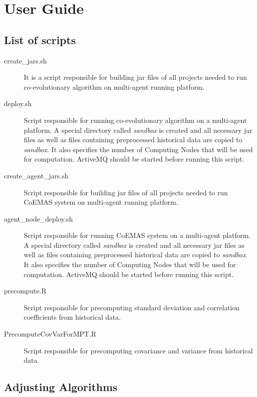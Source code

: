 \chapter{User Guide}
\label{cha:user_guide}



\section{List of scripts}

\begin{description}
  \item [create\_jars.sh]
      It is a script responsible for building jar files of all projects needed to run co-evolutionary algorithm on multi-agent running platform. 
  \item [deploy.sh]
      Script responsible for running co-evolutionary algorithm on a multi-agent platform.
      A special directory called \emph{sandbox} is created and all necessary jar files as well as files containing preprocessed historical data are copied to \emph{sandbox}.
      It also specifies the number of Computing Nodes that will be used for computation.
      ActiveMQ should be started before running this script.
  \item [create\_agent\_jars.sh]
      Script responsible for building jar files of all projects needed to run CoEMAS system on multi-agent running platform. 
  \item [agent\_node\_deploy.sh]
      Script responsible for running CoEMAS system on a multi-agent platform.
      A special directory called \emph{sandbox} is created and all necessary jar files as well as files containing preprocessed historical data are copied to \emph{sandbox}.
      It also specifies the number of Computing Nodes that will be used for computation.
      ActiveMQ should be started before running this script. 
  \item [precompute.R]
      Script responsible for precomputing standard deviation and correlation coefficients from historical data.
  \item [PrecomputeCovVarForMPT.R]
      Script responsible for precomputing covariance and variance from historical data. 

\end{description}



\section{Adjusting Algorithms}


